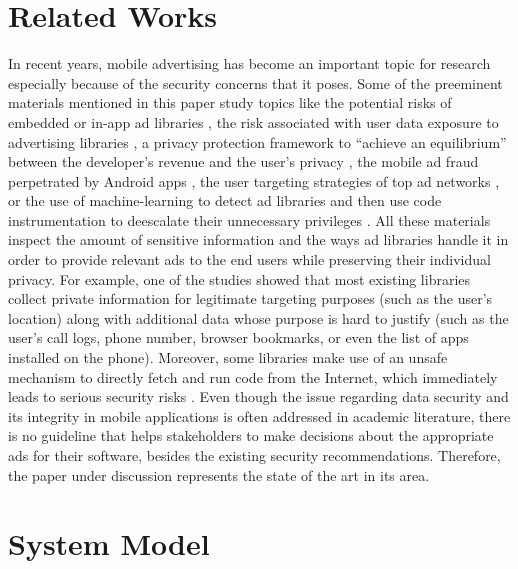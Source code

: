 \documentclass[conference]{IEEEtran}
\begin{document}
\section{Related Works}
In recent years, mobile advertising has become an important topic for research especially because of the security concerns that it poses. Some of the preeminent materials mentioned in this paper study topics like the potential risks of embedded or in-app ad libraries \cite{Grace}, the risk associated with user data exposure to advertising libraries \cite{meng2016price}, a privacy protection framework to “achieve an equilibrium” between the developer’s revenue and the user’s privacy \cite{leontiadis2012don}, the mobile ad fraud perpetrated by Android apps \cite{crussell2014madfraud}, the user targeting strategies of top ad networks \cite{nath2015madscope}, or the use of machine-learning to detect ad libraries and then use code instrumentation to deescalate their unnecessary privileges \cite{liu2015efficient}.
All these materials inspect the amount of sensitive information and the ways ad libraries handle it in order to provide relevant ads to the end users while preserving their individual privacy. For example, one of the studies showed that most existing libraries collect private information for legitimate targeting purposes (such as the user’s location) along with additional data whose purpose is hard to justify (such as the user’s call logs, phone number, browser bookmarks, or even the list of apps installed on the phone). Moreover, some libraries make use of an unsafe mechanism to directly fetch and run code from the Internet, which immediately leads to serious security risks \cite{Grace}. 
Even though the issue regarding data security and its integrity in mobile applications is often addressed in academic literature, there is no guideline that helps stakeholders to make decisions about the appropriate ads for their software, besides the existing security recommendations. Therefore, the paper under discussion represents the state of the art in its area.

\section{System Model}
\end{document}
